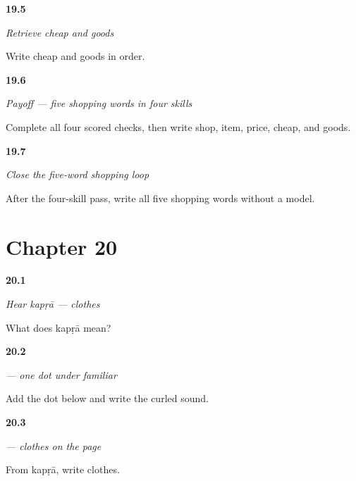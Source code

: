\noindent\begin{minipage}[t]{\linewidth}
\raggedright
\hypertarget{review-MW-R14-shopping-new-two-recall}{\textbf{19.5}} \emph{Retrieve cheap and goods}\par
\small Write cheap and goods in order.
\end{minipage}\par\medskip

\noindent\begin{minipage}[t]{\linewidth}
\raggedright
\hypertarget{review-MW-C14-shopping-five-payoff}{\textbf{19.6}} \emph{Payoff — five shopping words in four skills}\par
\small Complete all four scored checks, then write shop, item, price, cheap, and goods.
\end{minipage}\par\medskip

\noindent\begin{minipage}[t]{\linewidth}
\raggedright
\hypertarget{review-MW-R14-shopping-close-recall}{\textbf{19.7}} \emph{Close the five-word shopping loop}\par
\small After the four-skill pass, write all five shopping words without a model.
\end{minipage}\par\medskip

\section*{Chapter 20}

\noindent\begin{minipage}[t]{\linewidth}
\raggedright
\hypertarget{review-MW-C15-hear-kapda-meaning}{\textbf{20.1}} \emph{Hear \emph{kapṛā} — clothes}\par
\small What does kapṛā mean?
\end{minipage}\par\medskip

\noindent\begin{minipage}[t]{\linewidth}
\raggedright
\hypertarget{review-MW-W15-nukta-write}{\textbf{20.2}} \emph{ — one dot under familiar }\par
\small Add the dot below  and write the curled sound.
\end{minipage}\par\medskip

\noindent\begin{minipage}[t]{\linewidth}
\raggedright
\hypertarget{review-MW-C15-kapda-dictation}{\textbf{20.3}} \emph{ — clothes on the page}\par
\small From kapṛā, write clothes.
\end{minipage}\par\medskip

